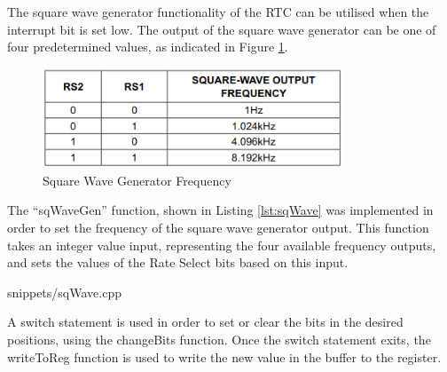 The square wave generator functionality of the RTC can be utilised when the
interrupt bit is set low. The output of the square wave generator can be one of
four predetermined values, as indicated in Figure \ref{fig:images-sqWave}.

\begin{figure}[H]
	\centering
	\includegraphics[width=0.8\textwidth]{images/sqWave}
	\caption{Square Wave Generator Frequency}
	\label{fig:images-sqWave}
\end{figure}

The ``sqWaveGen'' function, shown in Listing \ref{lst:sqWave} was implemented in order
to set the frequency of the square wave generator output. This function takes an
integer value input, representing the four available frequency outputs, and sets
the values of the Rate Select bits based on this input.


{snippets/sqWave.cpp}

A switch statement is used in order to set or clear the bits in the desired
positions, using the changeBits function. Once the switch statement exits, the
writeToReg function is used to write the new value in the buffer to the
register.

